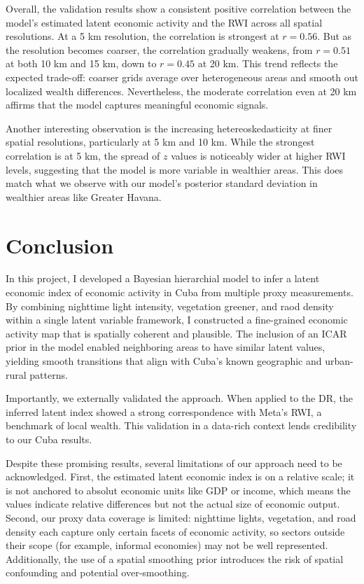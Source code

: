 \documentclass[12pt]{article}
\begin{document}
Overall, the validation results show a consistent positive correlation between the model's estimated latent economic activity and the RWI across all spatial resolutions. At a 5 km resolution, the correlation is strongest at $r = 0.56$. But as the resolution becomes coarser, the correlation gradually weakens, from $r = 0.51$ at both 10 km and 15 km, down to $r = 0.45$ at 20 km. This trend reflects the expected trade-off: coarser grids average over heterogeneous areas and smooth out localized wealth differences. Nevertheless, the moderate correlation even at 20 km affirms that the model captures meaningful economic signals. 

Another interesting observation is the increasing hetereoskedasticity at finer spatial resolutions, particularly at 5 km and 10 km. While the strongest correlation is at 5 km, the spread of $z$ values is noticeably wider at higher RWI levels, suggesting that the model is more variable in wealthier areas. This does match what we observe with our model's posterior standard deviation in wealthier areas like Greater Havana. 





\section{Conclusion}
\label{sec:discussion}

In this project, I developed a Bayesian hierarchial model to infer a latent economic index of economic activity in Cuba from multiple proxy measurements. By combining nighttime light intensity, vegetation greener, and raod density within a single latent variable framework, I constructed a fine-grained economic activity map that is spatially coherent and plausible. The inclusion of an ICAR prior in the model enabled neighboring areas to have similar latent values, yielding smooth transitions that align with Cuba's known geographic and urban-rural patterns. 

Importantly, we externally validated the approach. When applied to the DR, the inferred latent index showed a strong correspondence with Meta's RWI, a benchmark of local wealth. This validation in a data-rich context lends credibility to our Cuba results.

Despite these promising results, several limitations of our approach need to be acknowledged. First, the estimated latent economic index is on a relative scale; it is not anchored to absolut economic units like GDP or income, which means the values indicate relative differences but not the actual size of economic output. Second, our proxy data coverage is limited: nighttime lights, vegetation, and road density each capture only certain facets of economic activity, so sectors outside their scope (for example, informal economies) may not be well represented. Additionally, the use of a spatial smoothing prior introduces the risk of spatial confounding and potential over-smoothing.
\end{document}
